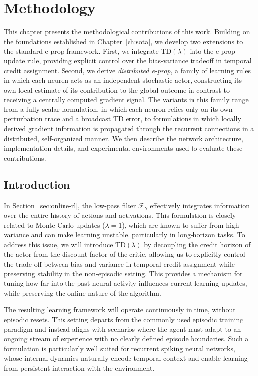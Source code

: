 \chapter{Methodology}
\label{ch:method}
This chapter presents the methodological contributions of this work. Building on the
foundations established in Chapter~\ref{ch:sota}, we develop two extensions to the standard e-prop
framework. First, we integrate TD$(\lambda)$ into the e-prop update rule, providing
explicit control over the bias-variance tradeoff in temporal credit assignment. Second,
we derive \emph{distributed e-prop}, a family of learning rules in which each neuron
acts as an independent stochastic actor, constructing its own local estimate of its
contribution to the global outcome in contrast to receiving a centrally computed gradient
signal. The variants in this family range from a fully scalar formulation, in which
each neuron relies only on its own perturbation trace and a broadcast TD error, to
formulations in which locally derived gradient information is propagated through the
recurrent connections in a distributed, self-organized manner. We then describe the
network architecture, implementation details, and experimental environments used to
evaluate these contributions.

\section{Introduction}

In Section~\ref{sec:online-rl}, the low-pass filter $\mathcal{F}_\gamma$ effectively
integrates information over the entire history of actions and activations.
This formulation is closely related to Monte Carlo updates ($\lambda = 1$), which are known to suffer from high variance and can make learning unstable, particularly in
long-horizon tasks. To address this issue, we will introduce TD$(\lambda)$
by decoupling the credit horizon of the actor from the discount factor of the
critic, allowing us to explicitly control the trade-off between bias and
variance in temporal credit assignment while preserving stability in the
non-episodic setting. This provides a mechanism for tuning how far into the
past neural activity influences current learning updates, while preserving
the online nature of the algorithm.

The resulting learning framework will operate continuously in time, without
episodic resets. This setting departs from the commonly used episodic
training paradigm and instead aligns with scenarios where the agent must
adapt to an ongoing stream of experience with no clearly defined episode
boundaries. Such a formulation is particularly well suited for recurrent
spiking neural networks, whose internal dynamics naturally encode temporal
context and enable learning from persistent interaction with the environment.

